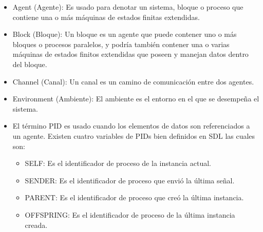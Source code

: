 \begin{itemize}
 \item Agent (Agente): Es usado para denotar un sistema, bloque o 
proceso que contiene una o m\'as m\'aquinas de estados finitas extendidas.
\item Block (Bloque): Un bloque es un agente que puede contener uno o m\'as 
bloques o procesos paralelos, y podr\'ia tambi\'en contener una o varias 
m\'aquinas de estados finitos extendidas que poseen y manejan datos dentro del 
bloque.
\item Channel (Canal): Un canal es un camino de comunicaci\'on entre dos 
agentes.
\item Environment (Ambiente): El ambiente es el entorno en el que se 
desempe\~na el sistema. 

\item El t\'ermino PID es usado cuando los elementos de datos son referenciados 
a un agente. Existen cuatro variables de PIDs bien definidos en SDL  las cuales 
son:

\begin{itemize}
 \item SELF: Es el identificador de proceso de la instancia actual.
 \item SENDER: Es el identificador de proceso que envi\'o la \'ultima se\~nal.
 \item PARENT: Es el identificador de proceso que cre\'o la \'ultima instancia.
 \item OFFSPRING: Es el identificador de proceso de la \'ultima instancia 
creada.

\end{itemize}


\end{itemize}
